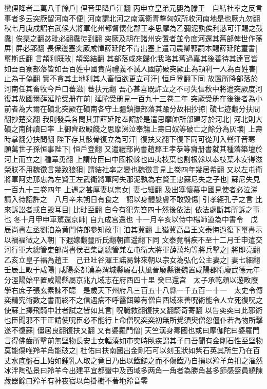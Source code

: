 蠻俚降者二萬八千餘戶|{
	俚音里降戶江翻}
丙申立皇弟元嬰為滕王　自結社率之反言事者多云突厥留河南不便|{
	河南謂北河之南漢衛青擊匈奴所收河南地是也厥九勿翻}
秋七月庚戍詔右武候大將軍化州都督懷化郡王李思摩為乙彌泥孰俟利苾可汗賜之鼓纛|{
	俟渠之翻苾毗必翻纛徒到翻}
突厥及胡在諸州安置者並令度河還其舊部俾世作藩屏|{
	屏必郢翻}
長保邊塞突厥咸憚薛延陀不肯出塞上遣司農卿郭嗣本賜薛延陀璽書|{
	璽斯氏翻}
言頡利既敗|{
	頡奚結翻}
其部落咸來歸化我略其舊過嘉其後善待其逹官皆如吾百寮部落皆如吾百姓中國貴尚禮義不滅人國前破突厥止為頡利一人為百姓害|{
	止為于偽翻}
實不貪其土地利其人畜恒欲更立可汗|{
	恒戶登翻下同}
故置所降部落於河南任其畜牧今戶口蕃滋|{
	蕃扶元翻}
吾心甚喜既許立之不可失信秋中將遣突厥度河復其故國爾薛延陀受册在前|{
	延陀受册見一百九十三卷二年}
突厥受册在後後者為小前者為大爾在磧北突厥在磧南各守土疆鎮撫部落其踰分故相抄掠|{
	磧七迹翻分扶問翻抄楚交翻}
我則發兵各問其罪薛延陀奉詔於是遣思摩帥所部建牙於河北|{
	河北則大磧之南帥讀曰率}
上御齊政殿餞之思摩涕泣奉觴上壽曰奴等破亡之餘分為灰壤|{
	上壽時掌翻分扶問翻}
陛下存其骸骨復立為可汗|{
	復扶又翻下復下同可從刋入聲汗音寒}
願萬世子孫恒事陛下|{
	恒戶登翻}
又遣禮部尚書趙郡王孝恭等齎册書就其種落築壇於河上而立之|{
	種章勇翻}
上謂侍臣曰中國根榦也四夷枝葉也割根榦以奉枝葉木安得滋榮朕不用魏徵言幾致狼狽|{
	謂結社率之變也魏徵言見上卷四年幾居希翻}
又以左屯衛將軍阿史那忠為左賢王左武衛將軍阿失那泥孰為右賢王忠蘇尼失之子也|{
	蘇尼失見一百九十三卷四年}
上遇之甚厚妻以宗女|{
	妻七細翻}
及出塞懷慕中國見使者必泣涕請入待詔許之　八月辛未朔日有食之　詔以身體髮膚不敢毁傷|{
	引孝經孔子之言}
比來訴訟者或自毁耳目|{
	比毗至翻}
自今有犯先笞四十然後依法|{
	依法處斷其所訴之事也}
冬十月甲申車駕還京師|{
	自九成宫還也}
十一月辛亥以侍中楊師道為中書令　戊辰尚書左丞劉洎為黄門侍郎參知政事|{
	洎其冀翻}
上猶冀高昌王文泰悔過復下璽書示以禍褔徵之入朝|{
	下遐嫁翻璽所氏翻朝直遥翻下同}
文泰竟稱疾不至十二月壬申遣交河行軍大總管吏部尚書侯君集副總管兼左屯衛大將軍薛萬均等將兵擊之|{
	將即亮翻}
乙亥立皇子褔為趙王　己丑吐谷渾王諾曷鉢來朝以宗女為弘化公主妻之|{
	妻七細翻}
壬辰上畋于咸陽|{
	咸陽秦都漢為渭城縣屬右扶風晉廢縣後魏置咸陽郡隋廢武德元年分涇陽始平置咸陽縣屬京兆九域志在府西四十里}
癸巳還宫　太子承乾頗以遊畋廢學右庶子張玄素諫不聼　是歲天下州府凡三百五十八縣一千五百一十一　太史令傳奕精究術數之書而終不之信遇病不呼醫餌藥有僧自西域來善呪術能令人立死復呪之使蘇上擇飛騎中壯者試之皆如其言|{
	呪職救翻復扶又翻騎奇寄翻}
以告奕奕曰此邪術也臣聞邪不干正請使呪臣必不能行上命僧呪奕奕初無所覺須臾僧忽僵仆若為物所擊遂不復蘇|{
	僵居良翻復扶又翻}
又有婆羅門僧|{
	天竺漢身毒國也或曰摩伽陀曰婆羅門}
言得佛齒所擊前無堅物長安士女輻湊如市奕時臥疾謂其子曰吾聞有金剛石性至堅物莫能傷唯羚羊角能破之|{
	杜佑曰扶南國出金剛石可以刻玉狀如紫石英其所生乃在百丈水底盤石上始如鍾乳人取之竟日乃出以鐵鎚之而不傷鐵乃自損以羚羊角扣之漼然冰泮陶弘景曰羚羊今出建平宜都蠻中及西域多两角一角者為勝角甚多節感蹙員繞陳藏器餘曰羚羊有神夜宿以角掛樹不著地羚音零}
